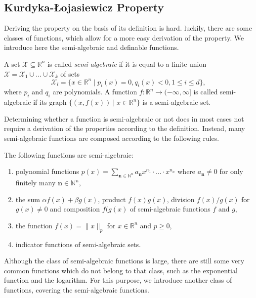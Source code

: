 \subsection{Kurdyka-{\L}ojasiewicz Property}
Deriving the \KL property on the basis of its definition is hard. luckily, there are some classes of functions, which allow for a more easy derivation of the \KL property. We introduce here the semi-algebraic and definable functions. 
\begin{definition}
A set $\mathcal{X}\subseteq \mathbb{R}^n$ is called \emph{semi-algebraic} if it is equal to a finite union $\mathcal{X}=\mathcal{X}_1\cup\ldots\cup\mathcal{X}_k$ of sets
\[\mathcal{X}_l=\{x\in\mathbb{R}^n\mid p_i(x)=0, q_i(x)<0, 1\leq i\leq d\},\]
where $p_i$ and $q_i$ are polynomials.
A function $f:\mathbb{R}^n\rightarrow (-\infty,\infty]$ is called semi-algebraic if its graph $\{(x,f(x))\mid x\in\mathbb{R}^n\}$ is a semi-algebraic set.
\end{definition}
Determining whether a function is semi-algebraic or not does in most cases not require a derivation of the properties according to the definition. Instead, many semi-algebraic functions are composed according to the following rules.
\begin{example}
The following functions are semi-algebraic:
\begin{enumerate}
    \item polynomial functions $p(x)=\sum_{\mathbf{n}\in\mathbb{N}^n}a_\mathbf{n}x^{n_1}\cdot\ldots\cdot x^{n_n}$ where $a_\mathbf{n}\neq 0$ for only finitely many $\mathbf{n}\in\mathbb{N}^n$, 
    \item the sum $\alpha f(x)+\beta g(x)$, product $f(x)g(x)$, division $f(x)/g(x)$ for $g(x)\neq 0$ and composition $f(g(x)$ of semi-algebraic functions $f$ and $g$,
    \item the function $f(x)=\|x\|_p$ for $x\in\mathbb{R}^n$ and $p\geq 0$,
    \item indicator functions of semi-algebraic sets.
\end{enumerate}
\end{example}
Although the class of semi-algebraic functions is large, there are still some very common functions which do not belong to that class, such as the exponential function and the logarithm. For this purpose, we introduce another class of functions, covering the semi-algebraic functions.
